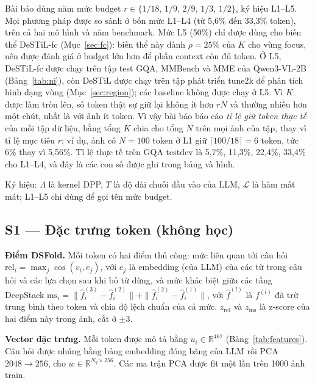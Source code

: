 \documentclass[conference]{IEEEtran}
\begin{document}
Bài báo dùng năm mức budget $r\in\{1/18,\,1/9,\,2/9,\,1/3,\,1/2\}$, ký hiệu L1--L5. Mọi phương pháp được so sánh ở bốn mức L1--L4 (từ 5,6\% đến 33,3\% token), trên cả hai mô hình và năm benchmark. Mức L5 (50\%) chỉ được dùng cho biến thể DeSTiL-fc (Mục~\ref{sec:fc}): biến thể này dành $\rho=25\%$ của $K$ cho vùng focus, nên được đánh giá ở budget lớn hơn để phần context còn đủ token. Ở L5, DeSTiL-fc được chạy trên tập test GQA, MMBench và MME của Qwen3-VL-2B (Bảng~\ref{tab:ni}), còn DeSTiL được chạy trên tập phát triển tune2k để phân tích hình dạng vùng (Mục~\ref{sec:region}); các baseline không được chạy ở L5. Vì $K$ được làm tròn lên, số token thật sự giữ lại không ít hơn $rN$ và thường nhiều hơn một chút, nhất là với ảnh ít token. Vì vậy bài báo báo cáo \emph{tỉ lệ giữ token thực tế} của mỗi tập dữ liệu, bằng tổng $K$ chia cho tổng $N$ trên mọi ảnh của tập, thay vì tỉ lệ mục tiêu $r$; ví dụ, ảnh có $N=100$ token ở L1 giữ $\lceil100/18\rceil=6$ token, tức 6\% thay vì 5,56\%. Tỉ lệ thực tế trên GQA testdev là 5,7\%, 11,3\%, 22,4\%, 33,4\% cho L1--L4, và đây là các con số được ghi trong bảng và hình.

Ký hiệu: $\Lambda$ là kernel DPP, $T$ là độ dài chuỗi đầu vào của LLM, $\mathcal{L}$ là hàm mất mát; L1--L5 chỉ dùng để gọi tên mức budget.

\subsection{S1 --- Đặc trưng token (không học)}
\label{sec:features}
\textbf{Điểm DSFold.} Mỗi token có hai điểm thủ công: mức liên quan tới câu hỏi $\mathrm{rel}_i=\max_{j}\cos(v_i,e_j)$, với $e_j$ là embedding (của LLM) của các từ trong câu hỏi và các lựa chọn sau khi bỏ từ dừng, và mức khác biệt giữa các tầng DeepStack $\mathrm{ms}_i=\|\hat f_i^{(3)}-\hat f_i^{(2)}\|+\|\hat f_i^{(2)}-\hat f_i^{(1)}\|$, với $\hat f^{(l)}$ là $f^{(l)}$ đã trừ trung bình theo token và chia độ lệch chuẩn của cả mức. $z_\text{rel}$ và $z_\text{ms}$ là z-score của hai điểm này trong ảnh, cắt ở $\pm3$.

\textbf{Vector đặc trưng.} Mỗi token được mô tả bằng $u_i\in\mathbb{R}^{467}$ (Bảng~\ref{tab:features}). Câu hỏi được nhúng bằng bảng embedding đóng băng của LLM rồi PCA $2048\rightarrow256$, cho $w\in\mathbb{R}^{N_q\times256}$. Các ma trận PCA được fit một lần trên 1000 ảnh train.
\end{document}

